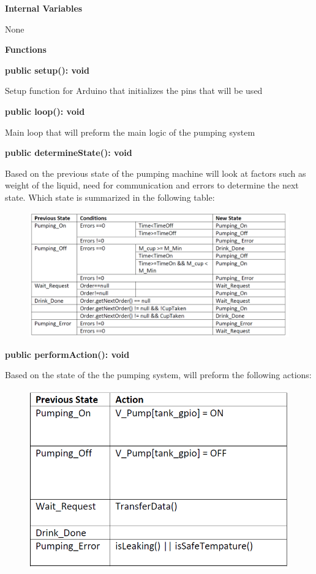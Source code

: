 \documentclass [10pt]{article}
\begin{document}
\textbf{Internal Variables}

 None

\textbf{Functions}

\textbf{public setup(): void}

Setup function for Arduino that initializes the pins that will be used 

\textbf{public loop(): void}

Main loop that will preform the main logic of the pumping system

\textbf{public determineState(): void}

Based on the previous state of the pumping machine will look at factors such as weight of the liquid, need for communication and errors to determine the next state. Which state is summarized in the following table:
\begin{figure} [h!]
	\centering
	\includegraphics [scale = 0.45] {figures/Pumping_DetermineState.png}
\end{figure}

\textbf{public performAction(): void}

Based on the state of the the pumping system, will preform the following actions:
\begin{figure} [h!]
	\centering
	\includegraphics [scale = 0.45] {figures/Pumping_PerformActions.png}
\end{figure}
\end{document}
